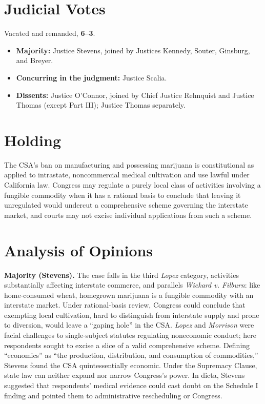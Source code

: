 \documentclass[12pt]{article}
\begin{document}
\section{Judicial Votes}

Vacated and remanded, \textbf{6--3}.
\begin{itemize}
\item \textbf{Majority:} Justice Stevens, joined by Justices Kennedy, Souter, Ginsburg, and Breyer.
\item \textbf{Concurring in the judgment:} Justice Scalia.
\item \textbf{Dissents:} Justice O'Connor, joined by Chief Justice Rehnquist and Justice Thomas (except Part III); Justice Thomas separately.
\end{itemize}

\section{Holding}

The CSA's ban on manufacturing and possessing marijuana is constitutional as applied to intrastate, noncommercial medical cultivation and use lawful under California law. Congress may regulate a purely local class of activities involving a fungible commodity when it has a rational basis to conclude that leaving it unregulated would undercut a comprehensive scheme governing the interstate market, and courts may not excise individual applications from such a scheme.

\section{Analysis of Opinions}

\textbf{Majority (Stevens).} The case falls in the third \textit{Lopez} category, activities substantially affecting interstate commerce, and parallels \textit{Wickard v. Filburn}: like home-consumed wheat, homegrown marijuana is a fungible commodity with an interstate market. Under rational-basis review, Congress could conclude that exempting local cultivation, hard to distinguish from interstate supply and prone to diversion, would leave a ``gaping hole'' in the CSA. \textit{Lopez} and \textit{Morrison} were facial challenges to single-subject statutes regulating noneconomic conduct; here respondents sought to excise a slice of a valid comprehensive scheme. Defining ``economics'' as ``the production, distribution, and consumption of commodities,'' Stevens found the CSA quintessentially economic. Under the Supremacy Clause, state law can neither expand nor narrow Congress's power. In dicta, Stevens suggested that respondents' medical evidence could cast doubt on the Schedule I finding and pointed them to administrative rescheduling or Congress.
\end{document}
